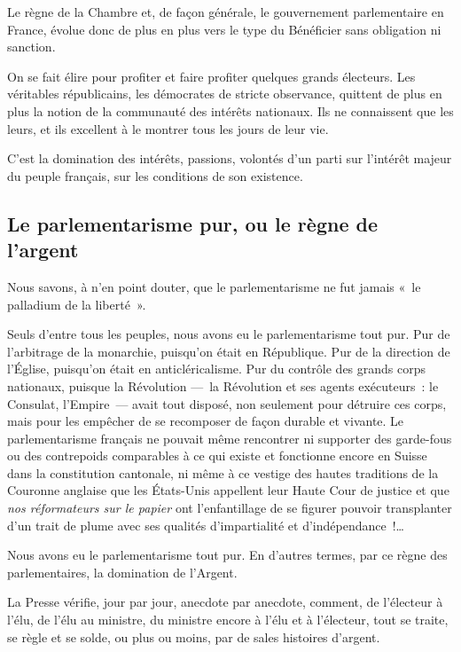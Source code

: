 \documentclass[french,twoside]{book} %
\newcommand{\astermono}{\medskip\centerline{\color{rubric}\large\selectfont{\syms ✻}}\medskip\par}%
\begin{document}
Le règne de la Chambre et, de façon générale, le gouvernement parlementaire en France, évolue donc de plus en plus vers le type du Bénéficier sans obligation ni sanction.\par
On se fait élire pour profiter et faire profiter quelques grands électeurs. Les véritables républicains, les démocrates de stricte observance, quittent de plus en plus la notion de la communauté des intérêts nationaux. Ils ne connaissent que les leurs, et ils excellent à le montrer tous les jours de leur vie.\par
C’est la domination des intérêts, passions, volontés d’un parti sur l’intérêt majeur du peuple français, sur les conditions de son existence.\par

\astermono

\subsection[{Le parlementarisme pur, ou le règne de l’argent}]{Le parlementarisme pur, ou le règne de l’argent}
\noindent Nous savons, à n’en point douter, que le parlementarisme ne fut jamais « le palladium de la liberté ».\par
Seuls d’entre tous les peuples, nous avons eu le parlementarisme tout pur. Pur de l’arbitrage de la monarchie, puisqu’on était en République. Pur de la direction de l’Église, puisqu’on était en anticléricalisme. Pur du contrôle des grands corps nationaux, puisque la Révolution — la Révolution et ses agents exécuteurs : le Consulat, l’Empire — avait tout disposé, non seulement pour détruire ces corps, mais pour les empêcher de se recomposer de façon durable et vivante. Le parlementarisme français ne pouvait même rencontrer ni supporter des garde-fous ou des contrepoids comparables à ce qui existe et fonctionne encore en Suisse dans la constitution cantonale, ni même à ce vestige des hautes traditions de la Couronne anglaise que les États-Unis appellent leur Haute Cour de justice et que \emph{nos réformateurs sur le papier} ont l’enfantillage de se figurer pouvoir transplanter d’un trait de plume avec ses qualités d’impartialité et d’indépendance !…\par
Nous avons eu le parlementarisme tout pur. En d’autres termes, par ce règne des parlementaires, la domination de l’Argent.\par
La Presse vérifie, jour par jour, anecdote par anecdote, comment, de l’électeur à l’élu, de l’élu au ministre, du ministre encore à l’élu et à l’électeur, tout se traite, se règle et se solde, ou plus ou moins, par de sales histoires d’argent.\par
\end{document}
